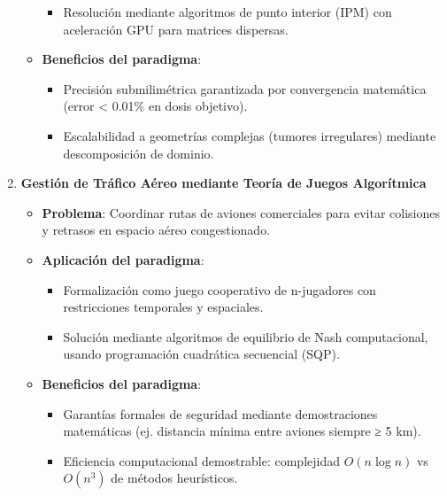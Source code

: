 \documentclass[14pt]{extarticle}
\begin{document}
\begin{enumerate}
\begin{itemize}
\begin{itemize}
            \item Resolución mediante algoritmos de punto interior (IPM) con aceleración GPU para matrices dispersas.
          \end{itemize}
          
        \item \textbf{Beneficios del paradigma}:

          \begin{itemize}
            \item Precisión submilimétrica garantizada por convergencia matemática (error < 0.01\% en dosis objetivo).
            
            \item Escalabilidad a geometrías complejas (tumores irregulares) mediante descomposición de dominio.
          \end{itemize}
      \end{itemize}

    \item \textbf{Gestión de Tráfico Aéreo mediante Teoría de Juegos Algorítmica}

      \begin{itemize}
        \item \textbf{Problema}: Coordinar rutas de aviones comerciales para evitar colisiones y retrasos en espacio aéreo congestionado.

        \item \textbf{Aplicación del paradigma}:

          \begin{itemize}
            \item Formalización como juego cooperativo de n-jugadores con restricciones temporales y espaciales.

            \item Solución mediante algoritmos de equilibrio de Nash computacional, usando programación cuadrática secuencial (SQP).
          \end{itemize}

        \item \textbf{Beneficios del paradigma}:

          \begin{itemize}
            \item Garantías formales de seguridad mediante demostraciones matemáticas (ej. distancia mínima entre aviones siempre ≥ 5 km).

            \item Eficiencia computacional demostrable: complejidad \(O(n \log n)\) vs \(O(n^3)\) de métodos heurísticos.
          \end{itemize}
      \end{itemize}
  \end{enumerate}
\end{document}

